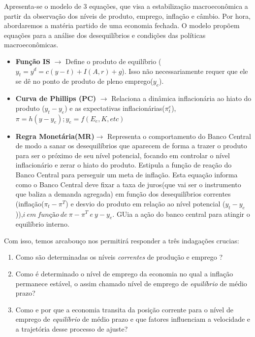 \documentclass[a4paper,12pt]{article}[abntex2]
\begin{document}
Apresenta-se o modelo de 3 equações, que visa a estabilização macroeconômica a partir da observação dos níveis de produto, emprego, inflação e câmbio. Por hora, abordaremos a matéria partido de uma economia fechada. O modelo propõem equações para a análise dos desequilíbrios e condições das políticas macroeconômicas. \begin{itemize}
    \item \textbf{Função IS} $\rightarrow$ Define o produto de equilíbrio ($y_t=y^d=c(y-t)+I(A,r)+g$). Isso não necessariamente requer que ele se dê no ponto de produto de pleno emprego($y_e$).
    \item \textbf{Curva de Phillips (PC)} $\rightarrow$ Relaciona a dinâmica inflacionária ao hiato do produto ($y_t-y_e$) e as expectativas inflacionárias($\pi_t^e$),$\pi=h(y-y_e);y_e=f(E_e,K,etc)$
    \item \textbf{Regra Monetária(MR)}$\rightarrow$ Representa o comportamento do Banco Central de modo a sanar os desequilíbrios que aparecem de forma a trazer o produto para ser o próximo de seu nível potencial, focando em controlar o nível inflacionário e zerar o hiato do produto. Estipula a função de reação do Banco Central para perseguir um meta de inflação. Esta equação informa como o Banco Central deve fixar a taxa de juros(que vai ser o instrumento que baliza a demanda agregada) em função dos desequilíbrios correntes (inflação($\pi_t - \pi^T$) e desvio do produto em relação ao nível potencial ($y_t-y_e$)),$i \ em \ função\  de \ \pi-\pi^T \ e \ y-y_e  $. GUia a ação do banco central para atingir o equilíbrio interno.
\end{itemize}
 
 Com isso, temos arcabouço nos permitirá responder a três indagações crucias: \begin{enumerate}
     \item Como são determinadas os níveis \textit{correntes} de produção e emprego ?
     \item Como é determinado o nível de emprego da economia no qual a inflação permanece estável, o assim chamado nível de emprego de \textit{equilíbrio} de médio prazo?
     \item Como e por que a economia transita da posição corrente para o nível de emprego de \textit{equilíbrio} de médio prazo e que fatores influenciam a velocidade e a trajetória desse processo de ajuste?  
 \end{enumerate}
\end{document}

